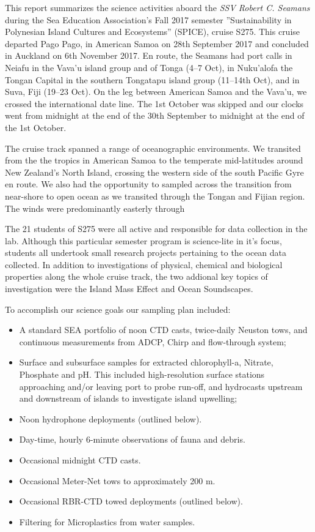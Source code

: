 \documentclass[letterpaper,11pt]{article}
\begin{document}
This report summarizes the science activities aboard the \textit{SSV Robert C. Seamans} during the Sea Education Association's Fall 2017 semester ''Sustainability in Polynesian Island Cultures and Ecosystems'' (SPICE), cruise S275. This cruise departed Pago Pago, in American Samoa on 28th September 2017 and concluded in Auckland on 6th November 2017. En route, the Seamans had port calls in Neiafu in the Vava'u island group and of Tonga (4--7 Oct), in Nuku'alofa the Tongan Capital in the southern Tongatapu island group (11--14th Oct), and in Suva, Fiji (19--23 Oct). On the leg between American Samoa and the Vava'u, we crossed the international date line. The 1st October was skipped and our clocks went from midnight at the end of the 30th September to midnight at the end of the 1st October.

The cruise track spanned a range of oceanographic environments. We transited from the the tropics in American Samoa to the temperate mid-latitudes around New Zealand's North Island, crossing the western side of the south Pacific Gyre en route. We also had the opportunity to sampled across the transition from near-shore to open ocean as we transited through the Tongan and Fijian region. The winds were predominantly easterly through

The 21 students of S275 were all active and responsible for data collection in the lab. Although this particular semester program is science-lite in it's focus, students all undertook small research projects pertaining to the ocean data collected. In addition to investigations of physical, chemical and biological properties along the whole cruise track, the two addional key topics of investigation were the Island Mass Effect and Ocean Soundscapes.

To accomplish our science goals our sampling plan included:

\begin{itemize}
  \item A standard SEA portfolio of noon CTD casts, twice-daily Neuston tows, and continuous measurements from ADCP, Chirp and flow-through system;
 \item Surface and subsurface samples for extracted chlorophyll-a, Nitrate, Phosphate and pH. This included high-resolution surface stations approaching and/or leaving port to probe run-off, and hydrocasts upstream and downstream of islands to investigate island upwelling;
 \item Noon hydrophone deployments (outlined below).
 \item Day-time, hourly 6-minute observations of fauna and debris.
 \item Occasional midnight CTD casts.
 \item Occasional Meter-Net tows to approximately 200 m.
 \item Occasional RBR-CTD towed deployments (outlined below).
 \item Filtering for Microplastics from water samples.
\end{itemize} 
\end{document}
